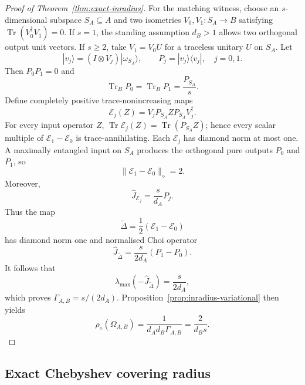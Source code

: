 \documentclass[11pt,a4paper]{article}
\theoremstyle{definition}
\theoremstyle{plain}
\theoremstyle{remark}
\DeclareMathOperator{\Tr}{Tr}
\begin{document}
\begin{proof}[Proof of Theorem~\ref{thm:exact-inradius}]
For the matching witness, choose an $s$-dimensional subspace $S_A\subseteq A$
and two isometries $V_0,V_1:S_A\to B$ satisfying
$\Tr(V_0^\dagger V_1)=0$. If $s=1$, the standing assumption $d_B>1$
allows two orthogonal output unit vectors. If $s\geq2$, take
$V_1=V_0U$ for a traceless unitary $U$ on $S_A$.
Let
\[
|v_j\rangle=(I\otimes V_j)|\omega_{S_A}\rangle,
\qquad P_j=|v_j\rangle\langle v_j|,
\quad j=0,1.
\]
Then $P_0P_1=0$ and
\[
\Tr_BP_0=\Tr_BP_1=\frac{P_{S_A}}s.
\]
Define completely positive trace-nonincreasing maps
\[
\mathcal E_j(Z)=V_jP_{S_A}ZP_{S_A}V_j^\dagger.
\]
For every input operator $Z$,
$\Tr\mathcal E_j(Z)=\Tr(P_{S_A}Z)$; hence every scalar multiple of
$\mathcal E_1-\mathcal E_0$ is trace-annihilating. Each $\mathcal E_j$ has
diamond norm at most one. A maximally entangled input on $S_A$
produces the orthogonal pure outputs $P_0$ and $P_1$, so
\[
\|\mathcal E_1-\mathcal E_0\|_\diamond=2.
\]
Moreover,
\[
\widehat J_{\mathcal E_j}=\frac{s}{d_A}P_j.
\]
Thus the map
\[
\widetilde\Delta=\frac12(\mathcal E_1-\mathcal E_0)
\]
has diamond norm one and normalised Choi operator
\[
\widehat J_{\widetilde\Delta}
=\frac{s}{2d_A}(P_1-P_0).
\]
It follows that
\[
\lambda_{\max}(-\widehat J_{\widetilde\Delta})
=\frac{s}{2d_A},
\]
which proves $\Gamma_{A,B}=s/(2d_A)$. Proposition~\ref{prop:inradius-variational}
then yields
\[
\rho_\diamond(\Omega_{A,B})
=\frac{1}{d_Ad_B\Gamma_{A,B}}
=\frac{2}{d_Bs}.
\]
\end{proof}

\subsection{Exact Chebyshev covering radius}
\label{app:chebyshev-radius-proof}
\end{document}
